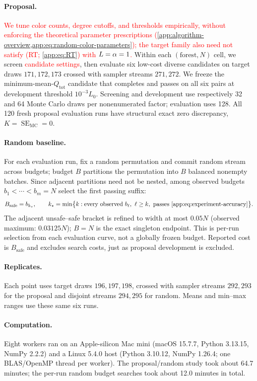 \paragraph{Proposal.}
\textcolor{red}{We tune color counts, degree cutoffs, and thresholds empirically,
without enforcing the theoretical parameter prescriptions
(\cref{app:algorithm-overview,app:eq:random-color-parameters}); the target family
also need not satisfy (RT; \cref{app:eq:RT}) with
$L=\alpha=1$.}
Within each $(\text{forest},N)$ cell, we screen \textcolor{red}{candidate settings},
then evaluate six low-cost diverse candidates on target
draws $171,172,173$ crossed with sampler streams $271,272$.
We freeze the minimum-mean-$Q_{\mathrm{tot}}$ candidate that completes
and passes on all six pairs at development threshold $10^{-3}L_0$.
Screening and development use respectively 32 and 64 Monte Carlo draws
per nonenumerated factor; evaluation uses 128.
All 120 fresh proposal evaluation runs have structural exact zero
discrepancy, $K=\operatorname{SE}_{\mathrm{MC}}=0$.

\paragraph{Random baseline.}
\label{app:experiment-random}
For each evaluation run, fix a random permutation and commit random stream
across budgets; budget $B$ partitions the permutation into $B$ balanced
nonempty batches. Since adjacent partitions need not be nested, among
observed budgets $b_1<\cdots<b_m=N$ select the first passing suffix:
\begin{equation}
 B_{\mathrm{safe}}=b_{k_\star},\qquad
 k_\star=\min\bigl\{k:\text{every observed }b_\ell,\ \ell\ge k,
                    \text{ passes \eqref{app:eq:experiment-accuracy}}\bigr\}.
 \label{app:eq:experiment-random-suffix}
\end{equation}
The adjacent unsafe--safe bracket is refined to width at most $0.05N$
(observed maximum: $0.03125N$); $B=N$ is the exact singleton endpoint.
This is per-run selection from each evaluation curve, not a globally frozen
budget. Reported cost is $B_{\mathrm{safe}}$ and excludes search costs,
just as proposal development is excluded.

\paragraph{Replicates.}
\label{app:experiment-replicates}
Each point uses target draws $196,197,198$, crossed with sampler streams
$292,293$ for the proposal and disjoint streams $294,295$ for random.
Means and min--max ranges use these same six runs.

\paragraph{Computation.}
\label{app:experiment-reproducibility}
Eight workers ran on an Apple-silicon Mac mini (macOS 15.7.7,
Python 3.13.15, NumPy 2.2.2) and a Linux 5.4.0 host (Python 3.10.12,
NumPy 1.26.4; one BLAS/OpenMP thread per worker).
The proposal/random study took about 64.7 minutes; the per-run random
budget searches took about 12.0 minutes in total.
